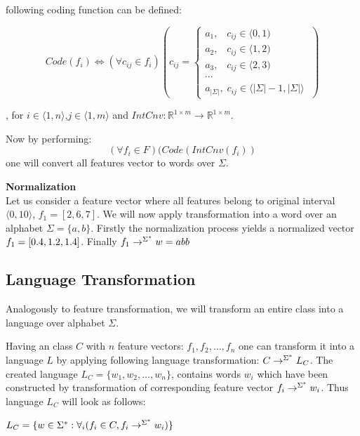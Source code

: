\documentclass{mini}
\begin{document}
following coding function can be defined:

\begin{equation}
Code(f_i) \Leftrightarrow (\forall{c_{ij} \in f_i})(c_{ij} = 
\begin{cases}
a_1 , \;\;\; c_{ij} \in  \langle 0 , 1)  \\
a_2 , \;\;\; c_{ij} \in  \langle 1 , 2 ) \\
a_3 , \;\;\; c_{ij} \in  \langle 2 , 3 )\\
\cdots \\
a_{|\Sigma|} , \; c_{ij} \in \langle |\Sigma| -1, |\Sigma|  \rangle\; 
\end{cases})
\end{equation}

, for $i \in \langle 1, n \rangle$,$j \in \langle 1, m \rangle$ and $IntCnv : \mathbb{R}^{1 \times m} \rightarrow \mathbb{R}^{1 \times m}$. 

Now by performing:
\begin{equation}
(\forall{f_i \in F})(Code(IntCnv(f_i))
\end{equation}
one will convert all features vector to words over $\Sigma$.

\begin{example} {\bf Normalization}\\
    Let us consider a feature vector where all features belong to original interval $\langle 0, 10 \rangle$, $f_1=[2, 6, 7]$. We will now apply transformation into a word over an alphabet $\Sigma=\{a,b\}$. Firstly the normalization process yields a normalized vector $f_1=[0.4, 1.2, 1.4]$. Finally $f_1 \rightarrow^{\Sigma^{*}}w=abb$
\end{example}


\subsection{Language Transformation}\label{sec:lan_theory_transf_lan}
Analogously to feature transformation, we will transform an entire class into a language over alphabet $\Sigma$.

Having an class $C$ with $n$ feature vectors: $f_1, f_2,\ldots,f_n$ one can transform it into a language $L$ by applying following language transformation: $C \rightarrow^{\Sigma^{*}} L_{C}$. The created language $L_{C} = \{w_1, w_2,\ldots,w_n\}$, contains words $w_i$ which have been constructed by transformation of corresponding feature vector $f_i \rightarrow^{\Sigma^{*}} w_i$. Thus language $L_{C}$ will look as follows:
\begin{center}
    $L_{C} = \{w \in \Sigma^{*} : \forall_{i} (f_{i} \in C, f_{i} \rightarrow^{\Sigma^{*}} w_{i}) \}$
\end{center}
\end{document}
